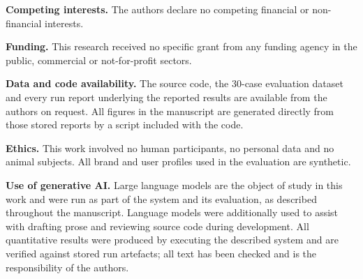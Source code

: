 \documentclass[11pt]{article}
\begin{document}
\vspace{6pt}
\noindent
\textbf{Competing interests.} The authors declare no competing financial or
non-financial interests.

\vspace{6pt}
\noindent
\textbf{Funding.} This research received no specific grant from any funding
agency in the public, commercial or not-for-profit sectors.

\vspace{6pt}
\noindent
\textbf{Data and code availability.} The source code, the 30-case evaluation
dataset and every run report underlying the reported results are available from
the authors on request. All figures in the manuscript are generated directly
from those stored reports by a script included with the code.

\vspace{6pt}
\noindent
\textbf{Ethics.} This work involved no human participants, no personal data and
no animal subjects. All brand and user profiles used in the evaluation are
synthetic.

\vspace{6pt}
\noindent
\textbf{Use of generative AI.} Large language models are the object of study in
this work and were run as part of the system and its evaluation, as described
throughout the manuscript. Language models were additionally used to assist
with drafting prose and reviewing source code during development. All
quantitative results were produced by executing the described system and are
verified against stored run artefacts; all text has been checked and is the
responsibility of the authors.
\end{document}
